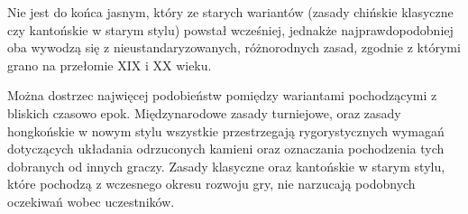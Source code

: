 Nie jest do końca jasnym, który ze starych wariantów (zasady chińskie klasyczne
czy kantońskie w starym stylu) powstał wcześniej, jednakże najprawdopodobniej
oba wywodzą się z nieustandaryzowanych, różnorodnych zasad, zgodnie z którymi
grano na przełomie XIX i XX wieku.

Można dostrzec najwięcej podobieństw pomiędzy wariantami pochodzącymi z bliskich
czasowo epok. Międzynarodowe zasady turniejowe,  oraz zasady
hongkońskie w nowym stylu wszystkie przestrzegają rygorystycznych wymagań
dotyczących układania odrzuconych kamieni oraz oznaczania pochodzenia
tych dobranych od innych graczy. Zasady klasyczne oraz kantońskie w starym
stylu, które pochodzą z wczesnego okresu rozwoju gry, nie narzucają podobnych
oczekiwań wobec uczestników.
